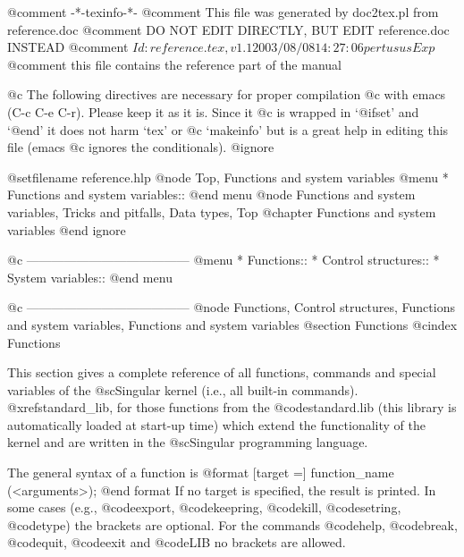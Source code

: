 @comment -*-texinfo-*-
@comment This file was generated by doc2tex.pl from reference.doc
@comment DO NOT EDIT DIRECTLY, BUT EDIT reference.doc INSTEAD
@comment $Id: reference.tex,v 1.1 2003/08/08 14:27:06 pertusus Exp $
@comment this file contains the reference part of the manual

@c The following directives are necessary for proper compilation
@c with emacs (C-c C-e C-r).  Please keep it as it is.  Since it
@c is wrapped in `@ifset' and `@end' it does not harm `tex' or
@c `makeinfo' but is a great help in editing this file (emacs
@c ignores the conditionals).
@ignore

@setfilename reference.hlp
@node Top, Functions and system variables
@menu
* Functions and system variables::
@end menu
@node Functions and system variables, Tricks and pitfalls, Data types, Top
@chapter Functions and system variables
@end ignore

@c ---------------------------------------
@menu
* Functions::
* Control structures::
* System variables::
@end menu

@c ---------------------------------------
@node Functions, Control structures, Functions and system variables, Functions and system variables
@section Functions
@cindex Functions

This section gives a complete reference of all functions, commands and
special variables of the @sc{Singular} kernel (i.e., all built-in
commands). @xref{standard_lib}, for those
functions from the @code{standard.lib} (this library is automatically
loaded at start-up time) which extend the functionality of the kernel
and are written
in the  @sc{Singular} programming language.

The general syntax of a function is
@format
                   [target =] function_name (<arguments>);
@end format
If no target is specified, the result is printed.
In some cases (e.g., @code{export}, @code{keepring}, @code{kill},
@code{setring}, @code{type}) the brackets are optional. For the commands
@code{help}, @code{break}, @code{quit}, @code{exit} and @code{LIB} no
brackets are allowed.

